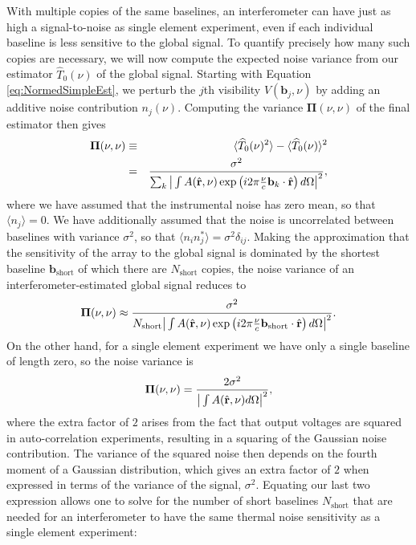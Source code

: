 \documentclass[twocolumn,apj,numberedappendix]{emulateapj}
\newcommand{\rhat}{\hat{\mathbf{r}}}
\begin{document}
With multiple copies of the same baselines, an interferometer can have just as high a signal-to-noise as single element experiment, even if each individual baseline is less sensitive to the global signal. To quantify precisely how many such copies are necessary, we will now compute the expected noise variance from our estimator $\widehat{T}_0 (\nu) $ of the global signal. Starting with Equation \eqref{eq:NormedSimpleEst}, we perturb the $j$th visibility $V(\mathbf{b}_j, \nu)$ by adding an additive noise contribution $n_j (\nu)$. Computing the variance $\boldsymbol \Pi(\nu,\nu)$ of the final estimator then gives
\begin{eqnarray}
\boldsymbol \Pi(\nu,\nu) &\equiv& \langle \widehat{T}_0 (\nu)^2 \rangle - \langle  \widehat{T}_0 (\nu) \rangle^2 \nonumber \\
&=&  \frac{\sigma^2}{ \sum_k \big{|} \int  A(\rhat, \nu) \exp\left(i 2\pi \frac{\nu }{c}\mathbf{b}_k \cdot \rhat \right)d\Omega \big{|}^2},
\end{eqnarray}
where we have assumed that the instrumental noise has zero mean, so that $\langle n_j \rangle = 0$. We have additionally assumed that the noise is uncorrelated between baselines with variance $\sigma^2$, so that $\langle n_i n_j^* \rangle = \sigma^2 \delta_{ij}$. Making the approximation that the sensitivity of the array to the global signal is dominated by the shortest baseline $\mathbf{b}_\textrm{short}$ of which there are $N_\textrm{short}$ copies, the noise variance of an interferometer-estimated global signal reduces to
\begin{equation}
\boldsymbol \Pi(\nu,\nu) \approx \frac{\sigma^2}{ N_\textrm{short} \big{|} \int  A(\rhat, \nu) \exp\left(i 2\pi \frac{\nu }{c}\mathbf{b}_\textrm{short} \cdot \rhat \right)d\Omega \big{|}^2}.
\end{equation}
On the other hand, for a single element experiment we have only a single baseline of length zero, so the noise variance is
\begin{equation}
\boldsymbol \Pi(\nu,\nu) = \frac{2 \sigma^2}{\big{|} \int  A(\rhat, \nu) d\Omega \big{|}^2},
\end{equation}
where the extra factor of $2$ arises from the fact that output voltages are squared in auto-correlation experiments, resulting in a squaring of the Gaussian noise contribution. The variance of the squared noise then depends on the fourth moment of a Gaussian distribution, which gives an extra factor of $2$ when expressed in terms of the variance of the signal, $\sigma^2$. Equating our last two expression allows one to solve for the number of short baselines $N_\textrm{short}$ that are needed for an interferometer to have the same thermal noise sensitivity as a single element experiment:
\end{document}
